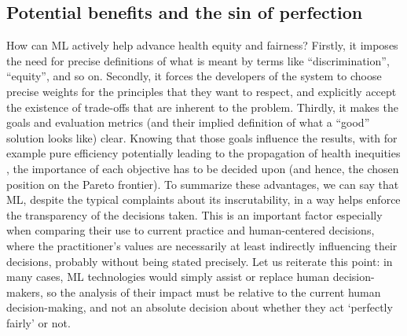 \subsection{Potential benefits and the sin of perfection}
    How can ML actively help advance health equity and fairness?
    Firstly, it imposes the need for precise definitions of what is meant by terms like ``discrimination'', ``equity'', and so on.
    Secondly, it forces the developers of the system to choose precise weights for the principles that they want to respect, and explicitly accept the existence of trade-offs that are inherent to the problem.
    Thirdly, it makes the goals and evaluation metrics (and their implied definition of what a ``good'' solution looks like) clear.
    Knowing that those goals influence the results, with for example pure efficiency potentially leading to the propagation of health inequities \cite[p.~2]{Rajkomar2018}, the importance of each objective has to be decided upon (and hence, the chosen position on the Pareto frontier).
    To summarize these advantages, we can say that ML, despite the typical complaints about its inscrutability, in a way helps enforce the transparency of the decisions taken.
    This is an important factor especially when comparing their use to current practice and human-centered decisions, where the practitioner's values are necessarily at least indirectly influencing their decisions, probably without being stated precisely.
    Let us reiterate this point: in many cases, ML technologies would simply assist or replace human decision-makers, so the analysis of their impact must be relative to the current human decision-making, and not an absolute decision about whether they act `perfectly fairly' or not.
    
